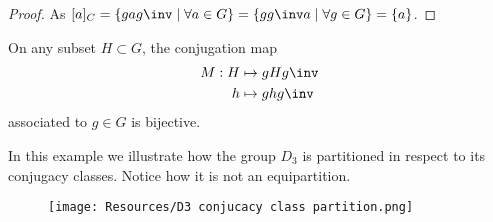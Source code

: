 \documentclass[12pt, a4paper]{article}
\begin{document}
\begin{proof}
    As \([a]_C =\{gag\inv \mid \forall a \in G\} =\{gg\inv a \mid \forall g \in G\} = \{a\}\).
\end{proof}

\begin{theorem}
    On any subset \(H \subset G\), the conjugation map 
    \[\begin{aligned}
        M:H &\mapsto gHg\inv \\
        h &\mapsto ghg\inv
    \end{aligned}\]
    associated to \(g\in G\) is bijective.
\end{theorem}

\begin{example}
    In this example we illustrate how the group \(D_3\) is partitioned in respect to its conjugacy classes. Notice how it is not an equipartition.
    \begin{figure}[H]
        \begin{center}
            \texttt{[image: Resources/D3 conjucacy class partition.png]}
        \end{center}
    \end{figure}
\end{example}
\end{document}
